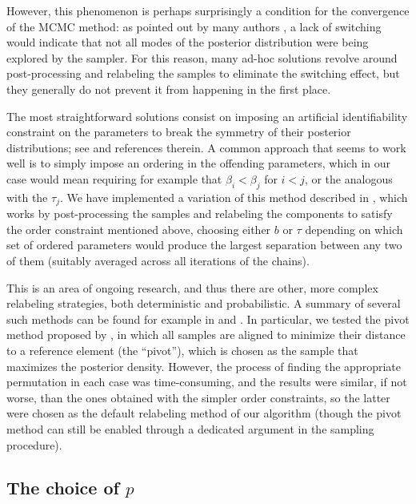 However, this phenomenon is perhaps surprisingly a condition for the convergence of the MCMC method: as pointed out by many authors \citep[e.g.][]{celeux2000computational}, a lack of switching would indicate that not all modes of the posterior distribution were being explored by the sampler. For this reason, many ad-hoc solutions revolve around post-processing and relabeling the samples to eliminate the switching effect, but they generally do not prevent it from happening in the first place.

The most straightforward solutions consist on imposing an artificial identifiability constraint on the parameters to break the symmetry of their posterior distributions; see \citet{jasra2005markov} and references therein. A common approach that seems to work well is to simply impose an ordering in the offending parameters, which in our case would mean requiring for example that \(\beta_i < \beta_j\) for \(i < j\), or the analogous with the \(\tau_j\). We have implemented a variation of this method described in \citet{simola2021approximate}, which works by post-processing the samples and relabeling the components to satisfy the order constraint mentioned above, choosing either \(b\) or \(\tau\) depending on which set of ordered parameters would produce the largest separation between any two of them (suitably averaged across all iterations of the chains).

This is an area of ongoing research, and thus there are other, more complex relabeling strategies, both deterministic and probabilistic. A summary of several such methods can be found for example in \citet{rodriguez2014label} and \citet{papastamoulis2015label}. In particular, we tested the pivot method proposed by \citet{marin2005bayesian}, in which all samples are aligned to minimize their distance to a reference element (the ``pivot''), which is chosen as the sample that maximizes the posterior density. However, the process of finding the appropriate permutation in each case was time-consuming, and the results were similar, if not worse, than the ones obtained with the simpler order constraints, so the latter were chosen as the default relabeling method of our algorithm (though the pivot method can still be enabled through a dedicated argument in the sampling procedure).

\subsection*{The choice of \(p\)}

